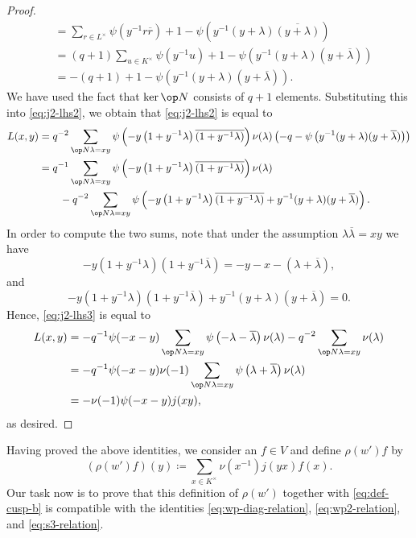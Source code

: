 \documentclass[../main.tex]{subfiles}
\begin{document}
\begin{proof}
\begin{align*}
		&= \sum_{r\in L^\times}\psi\left(y^{-1}r\overline r\right)+1-\psi\left(y^{-1}(y+\lambda)\overline{(y+\lambda)}\right) \\
		&= (q+1)\sum_{u\in K^\times}\psi\left(y^{-1}u\right)+1-\psi\left(y^{-1}(y+\lambda)(y+\overline\lambda)\right) \\
		&= -(q+1)+1-\psi\left(y^{-1}(y+\lambda)(y+\overline\lambda)\right).
	\end{align*}
	We have used the fact that $\ker\op N$ consists of $q+1$ elements. Substituting this into \eqref{eq:j2-lhs2}, we obtain that \eqref{eq:j2-lhs2} is equal to
	\begin{align}
		L(x,y) &= q^{-2}\sum_{\op N\lambda=xy}\psi\left(-y\left(1+y^{-1}\lambda\right)\overline{\left(1+y^{-1}\lambda\right)}\right)\nu(\lambda)\left(-q-\psi\left(y^{-1}(y+\lambda)(y+\overline\lambda)\right)\right) \notag \\
		&= q^{-1}\sum_{\op N\lambda=xy}\psi\left(-y\left(1+y^{-1}\lambda\right)\overline{\left(1+y^{-1}\lambda\right)}\right)\nu(\lambda) \notag \\
		&\qquad-q^{-2}\sum_{\op N\lambda=xy}\psi\left(-y\left(1+y^{-1}\lambda\right)\overline{\left(1+y^{-1}\lambda\right)}+y^{-1}(y+\lambda)(y+\overline\lambda)\right). \label{eq:j2-lhs3}
	\end{align}
	In order to compute the two sums, note that under the assumption $\lambda\overline\lambda=xy$ we have
	\[-y\left(1+y^{-1}\lambda\right)\left(1+y^{-1}\overline\lambda\right)=-y-x-(\lambda+\overline\lambda),\]
	and
	\[-y\left(1+y^{-1}\lambda\right)\left(1+y^{-1}\overline\lambda\right)+y^{-1}(y+\lambda)(y+\overline\lambda)=0.\]
	Hence, \eqref{eq:j2-lhs3} is equal to
	\begin{align*}
		L(x,y) &= -q^{-1}\psi(-x-y)\sum_{\op N\lambda=xy}\psi\left(-\lambda-\overline\lambda\right)\nu(\lambda)-q^{-2}\sum_{\op N\lambda=xy}\nu(\lambda) \\
		&= -q^{-1}\psi(-x-y)\nu(-1)\sum_{\op N\lambda=xy}\psi\left(\lambda+\overline\lambda\right)\nu(\lambda) \\
		&= -\nu(-1)\psi(-x-y)j(xy),
	\end{align*}
	as desired.
\end{proof}
Having proved the above identities, we consider an $f\in V$ and define $\rho(w')f$ by
\begin{equation}
	\left(\rho(w')f\right)(y) \coloneqq \sum_{x\in K^\times}\nu\left(x^{-1}\right)j(yx)f(x). \label{eq:def-cusp-wp}
\end{equation}
Our task now is to prove that this definition of $\rho(w')$ together with \eqref{eq:def-cusp-b} is compatible with the identities \eqref{eq:wp-diag-relation}, \eqref{eq:wp2-relation}, and \eqref{eq:s3-relation}.
\end{document}
